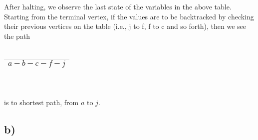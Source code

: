 \documentclass[11pt]{article}
\begin{document}
\\ \\
After halting, we observe the last state of the variables in the above table. Starting from 
the terminal vertex, if the values are to be backtracked by checking their previous vertices 
on the table (i.e., j to f, f to c and so forth), then we see the path
\\ \\
\begin{tabular}{l}
    $a-b-c-f-j$
\end{tabular}
\\ \\
is to shortest path, from $a$ to $j$.
\subsection*{b)}
\end{document}
